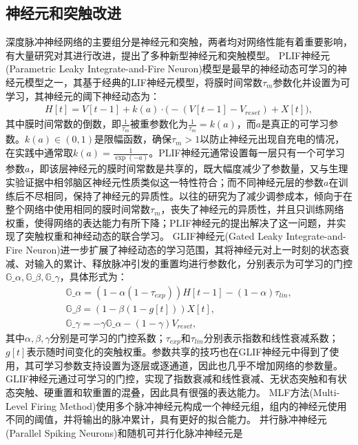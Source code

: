 \documentclass{SCIS2020cn}
\begin{document}
\subsection{神经元和突触改进}%
深度脉冲神经网络的主要组分是神经元和突触，两者均对网络性能有着重要影响，有大量研究对其进行改进，提出了多种新型神经元和突触模型。
PLIF神经元(Parametric Leaky Integrate-and-Fire Neuron)模型是最早的神经动态可学习的神经元模型之一，其基于经典的LIF神经元模型，将膜时间常数$\tau_{m}$参数化并设置为可学习，其神经元的阈下神经动态为：
\begin{align}
	H[t] = V[t-1] + k(a)\cdot\Big(-(V[t-1] - V_{reset}) + X[t]\Big), \label{eq, plif charge}
\end{align}
其中膜时间常数的倒数，即$\frac{1}{\tau_{m}}$被重参数化为$\frac{1}{\tau_{m}}=k(a)$，而$a$是真正的可学习参数。$k(a)\in (0, 1)$是限幅函数，确保$\tau_{m} > 1$以防止神经元出现自充电的情况，在实践中通常取$k(a) = \frac{1}{\exp(-a)}$。PLIF神经元通常设置每一层只有一个可学习参数$a$，即该层神经元的膜时间常数是共享的，既大幅度减少了参数量，又与生理实验证据中相邻脑区神经元性质类似这一特性符合；而不同神经元层的参数$a$在训练后不尽相同，保持了神经元的异质性。以往的研究为了减少调参成本，倾向于在整个网络中使用相同的膜时间常数$\tau_{m}$，丧失了神经元的异质性，并且只训练网络权重，使得网络的表达能力有所下降；PLIF神经元的提出解决了这一问题，并实现了突触权重和神经动态的联合学习。
GLIF神经元(Gated Leaky Integrate-and-Fire
Neuron)进一步扩展了神经动态的学习范围，其将神经元对上一时刻的状态衰减、对输入的累计、释放脉冲引发的重置均进行参数化，分别表示为可学习的门控$\mathbb{G}\_{\alpha}, \mathbb{G}\_{\beta}, \mathbb{G}\_{\gamma}$，具体形式为：
\begin{align}
	\mathbb{G}\_{\alpha} = (1 - \alpha (1 - \tau_{exp}))H[t-1] - (1 - \alpha)\tau_{lin}, \\
	\mathbb{G}\_{\beta} = (1 - \beta (1 - g[t]))X[t], \\
	\mathbb{G}\_{\gamma} = -\gamma \mathbb{G}\_{\alpha} - (1 - \gamma) V_{reset},
\end{align}
其中$\alpha, \beta, \gamma$分别是可学习的门控系数；$\tau_{exp}$和$\tau_{lin}$分别表示指数和线性衰减系数；$g[t]$表示随时间变化的突触权重。参数共享的技巧也在GLIF神经元中得到了使用，其可学习参数支持设置为逐层或逐通道，因此也几乎不增加网络的参数量。GLIF神经元通过可学习的门控，实现了指数衰减和线性衰减、无状态突触和有状态突触、硬重置和软重置的混叠，因此具有很强的表达能力。
MLF方法(Multi-Level Firing Method)使用多个脉冲神经元构成一个神经元组，组内的神经元使用不同的阈值，并将输出的脉冲累计，具有更好的拟合能力。
并行脉冲神经元(Parallel Spiking Neurons)和随机可并行化脉冲神经元是
\end{document}
